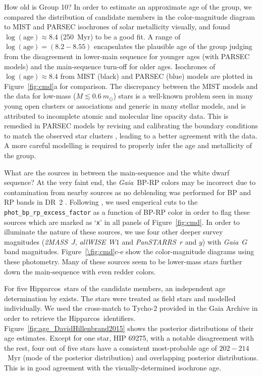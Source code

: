 \documentclass[modern,letterpaper]{aastex61}
\newcommand{\project}[1]{\textsl{#1}}
\newcommand{\acronym}[1]{{\small{#1}}}
\newcommand{\hipparcos}{Hipparcos}
\newcommand{\gaia}{\project{Gaia}}
\newcommand{\tmass}{\project{\acronym{2MASS}}}
\newcommand{\allwise}{\project{\acronym{allWISE}}}
\newcommand{\panstarrs}{\project{\acronym{PanSTARRS}}}
\newcommand{\figname}{Figure}
\newcommand{\groupTen}{Group 10}
\begin{document}
How old is \groupTen?
In order to estimate an approximate age of the group,
we compared the distribution of candidate members in the color-magnitude diagram
to MIST \citep[][with rotation]{2016ApJ...823..102C} and
PARSEC isochrones \citep[v1.2S;][]{2012MNRAS.427..127B,2015MNRAS.452.1068C}
of solar metallicity visually,
and found $\log(\mathrm{age}) \approx 8.4$ (250~Myr) to be a good fit.
A range of $\log(\mathrm{age}) = (8.2-8.55)$ encapsulates the plausible
age of the group judging from the disagreement in lower-main sequence for
younger ages (with PARSEC models) and the main-sequence turn-off for older ages.
Isochrones of $\log(\mathrm{age}) \approx 8.4$
from MIST (black) and PARSEC (blue) models are plotted in \figname~\ref{fig:cmd}a
for comparison.
The discrepancy between the MIST models and the data for low-mass
($M\lesssim0.6~m_\odot$) stars is a well-known problem seen in many young open
clusters or associations and generic in many stellar models, and is attributed
to incomplete atomic and molecular line opacity data.
This is remedied in PARSEC models by revising and calibrating the boundary
conditions to match the observed star clusters
\citep{2014MNRAS.444.2525C}, leading to a better agreement with the data.
A more careful modelling is required to properly infer the age and metallicity
of the group.

What are the sources in between the main-sequence and the white dwarf sequence?
At the very faint end, the \gaia\ BP-RP colors may be incorrect due to
contamination from nearby sources as no deblending was performed for BP and RP
bands in DR~2 \citep{2018arXiv180409368E}.
Following \citet{2018arXiv180409378G}, we used emperical cuts to the
\texttt{phot\_bp\_rp\_excess\_factor} as a function of BP-RP color in order to
flag these sources which are marked as `\texttt{x}' in all panels of
Figure~\ref{fig:cmd}.
In order to illuminate the nature of these sources, we use four other deeper
survey magnitudes (\tmass\ $J$, \allwise\ $W1$ and \panstarrs\ $r$ and $y$) with
\gaia\ $G$ band magnitudes.
\figname~\ref{\fig:cmd}c-e show the color-magnitude diagrams using these photometry.
%
Many of these sources seem to be lower-mass stars further down the main-sequence
with even redder colors.

For five \hipparcos\ stars of the candidate members,
an independent age determination by \citet{2015ApJ...804..146D} exists.
The stars were treated as field stars and modelled individually.
We used the cross-match to Tycho-2 provided in the Gaia Archive
in order to retrieve the \hipparcos\ identifiers.
Figure~\ref{fig:age_DavidHillenbrand2015} shows the posterior distributions
of their age estimates.
Except for one star, HIP 69275, with a notable disagreement with the rest,
four out of five stars have a consistent most-probable age of $202-214$~Myr
(mode of the posterior distribution) and overlapping posterior distributions.
This is in good agreement with the visually-determined isochrone age.
\end{document}
